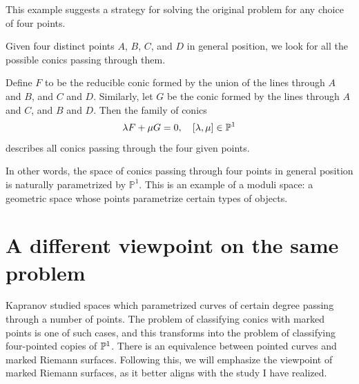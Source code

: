 \documentclass[12pt]{memoir}
\begin{document}

    \newpage
This example suggests a strategy for solving the original problem for any choice of four points.

\begin{Ex}
    Given four distinct points $A$, $B$, $C$, and $D$ in general position, we look for all the possible conics passing through them.\par
    Define $F$ to be the reducible conic formed by the union of the lines through $A$ and $B$, and $C$ and $D$. Similarly, let $G$ be the conic formed by the lines through $A$ and $C$, and $B$ and $D$. Then the family of conics
    $$\lambda F+\mu G=0,\quad [\lambda,\mu]\in\mathbb{P}^1$$
    describes all conics passing through the four given points.
\end{Ex}



In other words, the space of conics passing through four points in general position is naturally parametrized by $\mathbb{P}^1$. This is an example of a moduli space: a geometric space whose points parametrize certain types of objects. 

\section{A different viewpoint on the same problem}

Kapranov \cite{KapranovPaper} studied spaces which parametrized curves of certain degree passing through a number of points. The problem of classifying conics with marked points is one of such cases, and this transforms into the problem of classifying four-pointed copies of $\mathbb{P}^1$. There is an equivalence between pointed curves and marked Riemann surfaces. Following this, we will emphasize the viewpoint of marked Riemann surfaces, as it better aligns with the study I have realized. 
\end{document}
